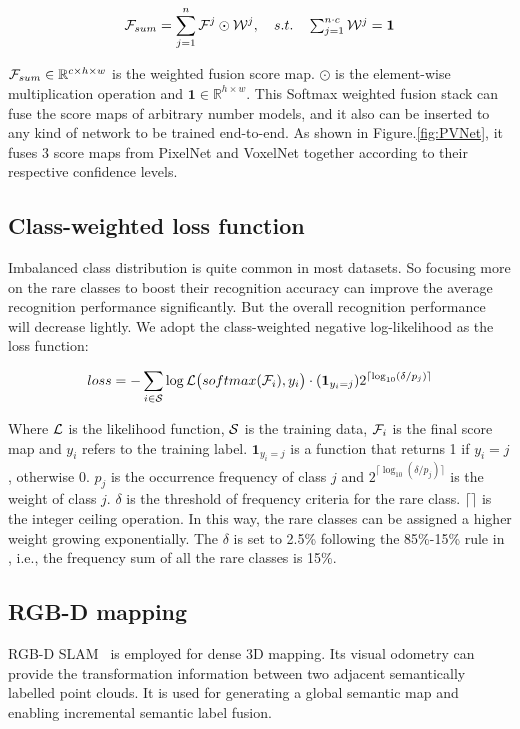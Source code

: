 \documentclass[letterpaper, 10 pt, conference]{ieeeconf}
\begin{document}
\begin{equation}
{\cal F}_{sum} = \sum_{j=1}^{n} {\cal F}^{j} \odot {\cal W}^{j}, \quad s.t. \quad \textstyle \sum_{j=1}^{n \cdot c } {\cal W}^{j} = \textbf{1}  
\label{eq:Softmax weighed fusion3}
\end{equation}

${\cal F}_{sum} \in \mathbb{R}^{c \times h \times w} $ is the weighted fusion score map. $\odot$ is the element-wise multiplication operation and $\textbf{1} \in \mathbb{R}^{h \times w}$. This Softmax weighted fusion stack can fuse the score maps of arbitrary number models, and it also can be inserted to any kind of network to be trained end-to-end. As shown in Figure.\ref{fig:PVNet}, it fuses 3 score maps from PixelNet and VoxelNet together according to their respective confidence levels.

\subsection{Class-weighted loss function}\label{sec:3.5}
Imbalanced class distribution is quite common in most datasets. So focusing more on the rare classes to boost their recognition accuracy can improve the average recognition performance significantly. But the overall recognition performance will decrease lightly. We adopt the class-weighted negative log-likelihood as the loss function:

\begin{equation}
loss = - \sum_{i \in {\cal S}} \log {\cal L} \big( softmax( {\cal F}_{i} ), y_{i} \big) \cdot ( \textbf{1}_{y_{i} = j} ) 2^{\lceil \log_{10} (\delta/p_{j}) \rceil}  
\label{eq:weighted loss function}
\end{equation}

Where ${\cal L}$ is the likelihood function, ${\cal S}$ is the training data, ${\cal F}_{i}$ is the final score map and $y_{i}$ refers to the training label. $\textbf{1}_{y_{i} = j}$ is a function that returns 1 if $y_{i} = j$, otherwise 0. $p_{j}$ is the occurrence frequency of class $j$ and $2^{\lceil \log_{10} (\delta/p_{j}) \rceil}$ is the weight of class $j$. $\delta$ is the threshold of frequency criteria for the rare class. $\lceil \rceil$ is the integer ceiling operation. In this way, the rare classes can be assigned a higher weight growing exponentially. The $\delta$ is set to 2.5\% following the 85\%-15\% rule in \cite{shuai2016dag}, i.e., the frequency sum of all the rare classes is 15\%. 

\subsection{RGB-D mapping}\label{sec:3.6}
RGB-D SLAM~\cite{endres20143} is employed for dense 3D mapping. Its visual odometry can provide the transformation information between two adjacent semantically labelled point clouds. It is used for generating a global semantic map and enabling incremental semantic label fusion.  
\end{document}
